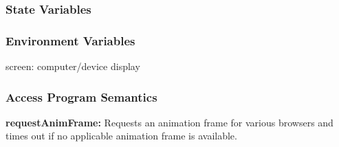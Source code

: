 \documentclass[11pt, oneside]{article}   	%
\begin{document}
\subsubsection*{State Variables}
\subsubsection*{Environment Variables}
screen: computer/device display

\subsubsection*{Access Program Semantics} 
 \textbf{requestAnimFrame:} Requests an animation frame for various browsers and times out if no applicable animation frame is available.

\end{document}
